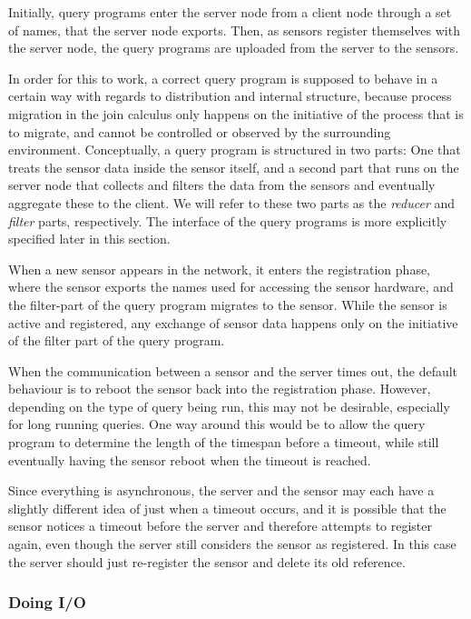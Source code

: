 Initially, query programs enter the server node from a client node
through a set of names, that the server node exports.
Then, as sensors register themselves with the server node, the query
programs are uploaded from the server to the sensors.

In order for this to work, a correct query program is supposed to 
behave in a certain way with regards to distribution and internal
structure, because process migration in the join calculus only happens on 
the initiative of the process that is to migrate, and cannot be controlled
or observed by the surrounding environment.
Conceptually, a query program is structured in two parts: One that 
treats the sensor data inside the sensor itself, and a second part
that runs on the server node that collects and filters the data from
the sensors and eventually aggregate these to the client. We will refer
to these two parts as the \emph{reducer} and \emph{filter} parts, respectively.
The interface of the query programs is more explicitly specified later
in this section.

When a new sensor appears in the network, it enters the registration
phase, where the sensor exports the names used for accessing the 
sensor hardware, and the filter-part of the query program migrates to
the sensor.
While the sensor is active and registered, any exchange of sensor data
happens only on the initiative of the filter part of the query
program.

When the communication between a sensor and the server times out, the
default behaviour is to reboot the sensor back into the registration
phase.
However, depending on the type of query being run, this may not be desirable,
especially for long running queries.
One way around this would be to allow the query program to determine
the length of the timespan before a timeout, while still eventually 
having the sensor reboot when the timeout is reached.

Since everything is asynchronous, the server and the sensor may each
have a slightly different idea of just when a timeout occurs, and it
is possible that the sensor notices a timeout before the server and
therefore attempts to register again, even though the server still
considers the sensor as registered. In this case the server should
just re-register the sensor and delete its old reference.

\subsubsection{Doing I/O}

